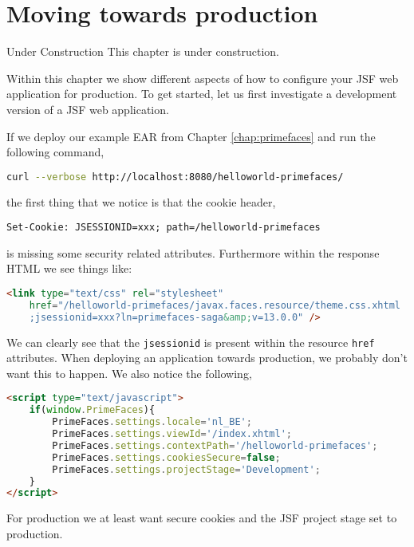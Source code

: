 %

\chapter{Moving towards production}

\begin{TODO}{Under Construction}
This chapter is under construction.
\end{TODO}

Within this chapter we show different aspects of how to configure your JSF web application for production.
To get started, let us first investigate a development version of a JSF web application.

If we deploy our example EAR from Chapter \ref{chap:primefaces}  and run the following command,
\begin{lstlisting}[language=bash]
curl --verbose http://localhost:8080/helloworld-primefaces/
\end{lstlisting}
the first thing that we notice is that the cookie header,
\begin{lstlisting}
Set-Cookie: JSESSIONID=xxx; path=/helloworld-primefaces
\end{lstlisting}
is missing some security related attributes.
Furthermore within the response HTML we see things like:
\begin{lstlisting}[language=html]
<link type="text/css" rel="stylesheet"
	href="/helloworld-primefaces/javax.faces.resource/theme.css.xhtml
	;jsessionid=xxx?ln=primefaces-saga&amp;v=13.0.0" />
\end{lstlisting}
We can clearly see that the \texttt{jsessionid} is present within the resource \texttt{href} attributes.
When deploying an application towards production, we probably don't want this to happen.
We also notice the following,
\begin{lstlisting}[language=html]
<script type="text/javascript">
	if(window.PrimeFaces){
		PrimeFaces.settings.locale='nl_BE';
		PrimeFaces.settings.viewId='/index.xhtml';
		PrimeFaces.settings.contextPath='/helloworld-primefaces';
		PrimeFaces.settings.cookiesSecure=false;
		PrimeFaces.settings.projectStage='Development';
	}
</script>
\end{lstlisting}
For production we at least want secure cookies and the JSF project stage set to production.

